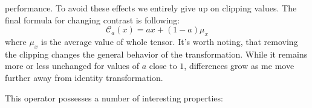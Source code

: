         performance. To avoid these effects we entirely give up on clipping
        values.  The final formula for changing contrast is following:
        \begin{equation}
            \label{eq:contrast}
            \mathcal{C}_a(x) = ax + (1-a) \mu_x
        \end{equation}
        where $\mu_x$ is the average value of whole tensor. It's worth
        noting, that removing the clipping changes the general behavior of the
        transformation.  While it remains more or less unchanged for values of
        $a$ close to $1$, differences grow as me move further away from identity
        transformation.

        This operator possesses a number of interesting properties:
